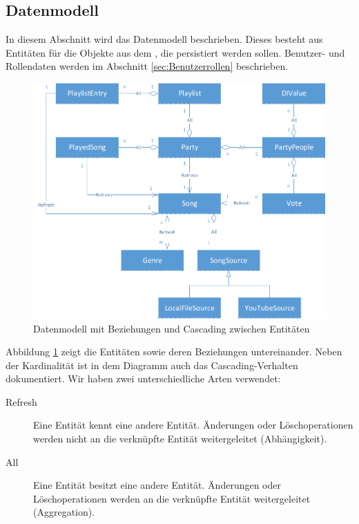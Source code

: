 \subsection{Datenmodell}

In diesem Abschnitt wird das Datenmodell beschrieben. Dieses besteht aus Entitäten für die Objekte aus dem , die persistiert werden sollen. Benutzer- und Rollendaten werden im Abschnitt \ref{sec:Benutzerrollen} beschrieben.

\begin{figure}[htb]
\centering
\includegraphics[width=1\linewidth]{Bilder/Datenmodell}
\caption{Datenmodell mit Beziehungen und Cascading zwischen Entitäten}
\label{fig:Datenmodell}
\end{figure}

Abbildung \ref{fig:Datenmodell} zeigt die Entitäten sowie deren Beziehungen untereinander. Neben der Kardinalität ist in dem Diagramm auch das Cascading-Verhalten dokumentiert. Wir haben zwei unterschiedliche Arten verwendet:
\begin{description}
	\item[Refresh] Eine Entität kennt eine andere Entität. Änderungen oder Löschoperationen werden nicht an die verknüpfte Entität weitergeleitet (Abhängigkeit).
	\item[All] Eine Entität besitzt eine andere Entität. 
	Änderungen oder Löschoperationen werden an die 
	verknüpfte Entität weitergeleitet (Aggregation).
\end{description}


